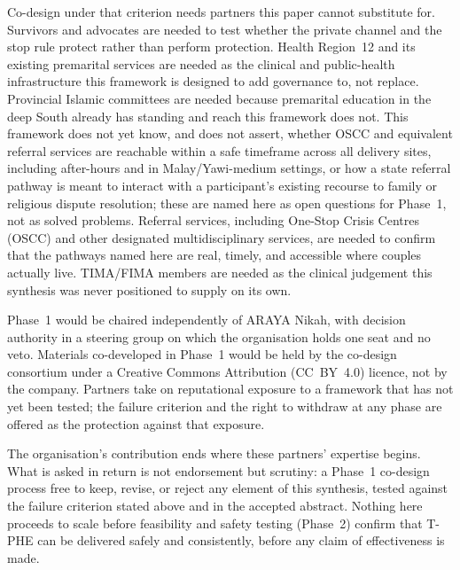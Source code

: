 \documentclass[10pt,twocolumn]{article}
\newcommand{\tphe}{T\mbox{-}PHE}
\begin{document}
Co-design under that criterion needs partners this paper cannot substitute for. Survivors and advocates are needed to test whether the private channel and the stop rule protect rather than perform protection. Health Region~12 and its existing premarital services are needed as the clinical and public-health infrastructure this framework is designed to add governance to, not replace. Provincial Islamic committees are needed because premarital education in the deep South already has standing and reach this framework does not. This framework does not yet know, and does not assert, whether OSCC and equivalent referral services are reachable within a safe timeframe across all delivery sites, including after-hours and in Malay/Yawi-medium settings, or how a state referral pathway is meant to interact with a participant's existing recourse to family or religious dispute resolution; these are named here as open questions for Phase~1, not as solved problems. Referral services, including One-Stop Crisis Centres (OSCC) and other designated multidisciplinary services, are needed to confirm that the pathways named here are real, timely, and accessible where couples actually live. TIMA/FIMA members are needed as the clinical judgement this synthesis was never positioned to supply on its own.

Phase~1 would be chaired independently of ARAYA Nikah, with decision authority in a steering group on which the organisation holds one seat and no veto. Materials co-developed in Phase~1 would be held by the co-design consortium under a Creative Commons Attribution (CC~BY~4.0) licence, not by the company. Partners take on reputational exposure to a framework that has not yet been tested; the failure criterion and the right to withdraw at any phase are offered as the protection against that exposure.

The organisation's contribution ends where these partners' expertise begins. What is asked in return is not endorsement but scrutiny: a Phase~1 co-design process free to keep, revise, or reject any element of this synthesis, tested against the failure criterion stated above and in the accepted abstract. Nothing here proceeds to scale before feasibility and safety testing (Phase~2) confirm that \tphe{} can be delivered safely and consistently, before any claim of effectiveness is made.
\end{document}
